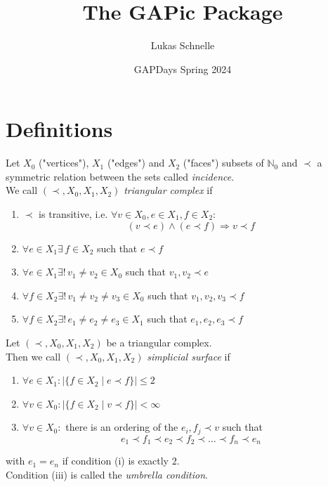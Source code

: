 \documentclass{beamer}
\title{The GAPic Package}
\subtitle{}
\author{Lukas Schnelle}
\date{GAPDays Spring 2024}
\numberwithin{equation}{aufgabe}
\newcommand\N{\mathbb N}
\begin{document}
\frame[plain]{\titlepage}

\section{Definitions}
\begin{frame}
    \begin{definition}\label{def:triangular-comp}
    	Let $X_0$ ("vertices"), $X_1$ ("edges") and $X_2$ ("faces") subsets of $\N_0$ and $\prec$ a symmetric relation between the sets called \emph{incidence}. \pause \\
    	We call $(\prec, X_0, X_1, X_2)$ \emph{triangular complex} if
    	\begin{enumerate}[label=(\roman*)] \pause 
    		\item $\prec$ is transitive, i.e. $\forall v \in X_0, e \in X_1, f \in X_2$:
    		$$(v \prec e) \wedge (e \prec f) \Rightarrow v \prec f$$
    		\item $\forall e \in X_1 \exists \, f \in X_2$ such that $e \prec f$ \pause 
    		\item \pause $\forall e \in X_1 \exists !\,  v_1 \neq v_2 \in X_0$ such that $v_1, v_2 \prec e$ \pause 
    		\item $\forall f \in X_2 \exists ! \, v_1 \neq v_2 \neq v_3 \in X_0$ such that $v_1, v_2, v_3 \prec f$ \pause 
            \item $\forall f \in X_2 \exists ! \, e_1 \neq e_2 \neq e_3 \in X_1$ such that $e_1, e_2, e_3 \prec f$ \pause 
    	\end{enumerate}
    \end{definition}
\end{frame}

\begin{frame}
    \begin{definition}
        Let $(\prec, X_0, X_1, X_2)$ be a triangular complex.\\
        Then we call $(\prec, X_0, X_1, X_2)$ \emph{simplicial surface} if \pause
        \begin{enumerate}[label=(\roman*)]
            \item $\forall e \in X_1 : | \{ f \in X_2 \mid e \prec f \} | \leq 2 $ \pause
            \item $\forall v \in X_0 : | \{ f \in X_2 \mid v \prec f \} | < \infty$ \pause
            \item $\forall v \in X_0: $ there is an ordering of the $e_i, f_j \prec v$ such that 
            $$
                e_1 \prec f_1 \prec e_2 \prec f_2 \prec \dots \prec f_{n} \prec e_{n}
            $$ \pause
        \end{enumerate} \vspace{-17px}
        with $e_1 = e_n$ if condition (i) is exactly $2$.\pause \\
        Condition (iii) is called the \emph{umbrella condition}.
    \end{definition}
\end{frame}
\end{document}
